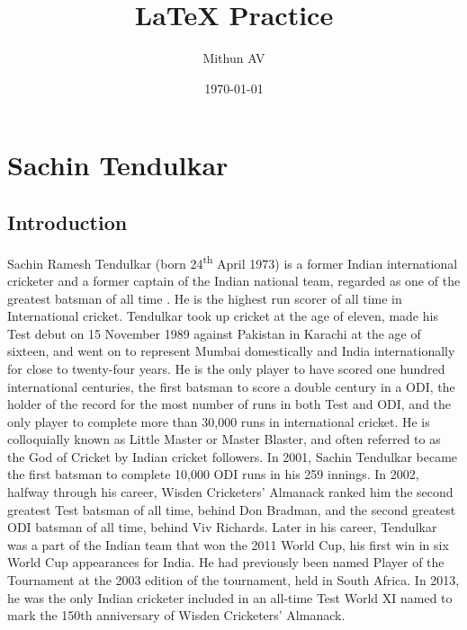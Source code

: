 \documentclass{report}
\begin{document}
	
	\title{LaTeX Practice}
	\author{Mithun AV}
	\date{\today}
	\maketitle
	\tableofcontents
	\listoffigures
	\listoftables
	
	\chapter{Sachin Tendulkar}
	
	\section{Introduction}
	Sachin Ramesh Tendulkar (born 24\textsuperscript{th} April 1973) is a former Indian international cricketer and a former captain of the Indian national team, regarded as one of the greatest batsman of all time \cite{sachin1}. He is the highest run scorer of all time in International cricket. Tendulkar took up cricket at the age of eleven, made his Test debut on 15 November 1989 against Pakistan in Karachi at the age of sixteen, and went on to represent Mumbai domestically and India internationally for close to twenty-four years. He is the only player to have scored one hundred international centuries, the first batsman to score a double century in a ODI, the holder of the record for the most number of runs in both Test and ODI, and the only player to complete more than 30,000 runs in international cricket. He is colloquially known as Little Master or Master Blaster, and often referred to as the God of Cricket by Indian cricket followers. In 2001, Sachin Tendulkar became the first batsman to complete 10,000 ODI runs in his 259 innings. In 2002, halfway through his career, Wisden Cricketers' Almanack ranked him the second greatest Test batsman of all time, behind Don Bradman, and the second greatest ODI batsman of all time, behind Viv Richards. Later in his career, Tendulkar was a part of the Indian team that won the 2011 World Cup, his first win in six World Cup appearances for India. He had previously been named Player of the Tournament at the 2003 edition of the tournament, held in South Africa. In 2013, he was the only Indian cricketer included in an all-time Test World XI named to mark the 150th anniversary of Wisden Cricketers' Almanack.
	
\end{document}
